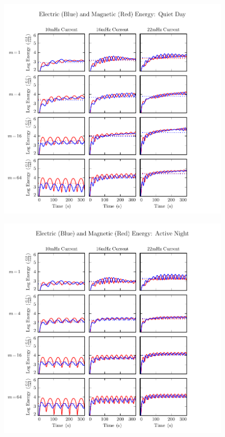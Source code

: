 \begin{figure}[H]
    \centering
    \includegraphics[width=\textwidth]{figures/UB_UE_J_2.pdf}
    \caption[Current-Driven Electric and Magnetic Energy: Quiet Day]{}
    \label{fig_UB_UE_J_2}
\end{figure}

\begin{figure}[H]
    \centering
    \includegraphics[width=\textwidth]{figures/UB_UE_J_3.pdf}
    \caption[Current-Driven Electric and Magnetic Energy: Active Night]{}
    \label{fig_UB_UE_J_3}
\end{figure}

